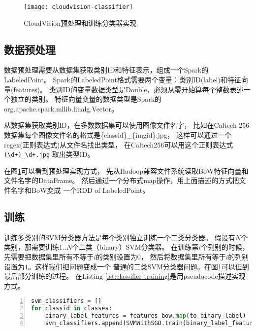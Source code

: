 \begin{figure}[h]
  \centering
    \texttt{[image: cloudvision-classifier]}
  \caption{CloudVision预处理和训练分类器实现}
  \label{fig:cloudvision-classifier}
\end{figure}



\subsection{数据预处理}
\label{subsec:classifier-preprocessing}
数据预处理需要从数据集获取类别ID和特征表示，组成一个Spark的LabeledPoint。
Spark的LabeledPoint格式需要两个变量：类别ID(label)和特征向量(features)。
类别ID的变量数据类型是Double，必须从零开始算每个整数表述一个独立的类别。
特征向量变量的数据类型是Spark的org.apache.spark.mllib.linalg.Vector。

从数据集获取类别ID，在多数数据集可以使用图像文件名字，
比如在Caltech-256数据集每个图像文件名的格式是\{classid\}\_\{imgid\}.jpg，
这样可以通过一个regex(正则表达式)从文件名找出类型，
在Caltech256可以用这个正则表达式\verb|(\d+)_\d+.jpg|
取出类型ID。

在图\ref{fig:cloudvision-classifier}可以看到预处理实现方式，
先从Hadoop兼容文件系统读取BoW特征向量和文件名字的DataFrame。
然后通过一个分布式map操作，用上面描述的方式把文件名字和BoW变成
一个RDD of LabeledPoint。



\subsection{训练}
\label{subsec:classifier-training}
训练多类别的SVM分类器方法是每个类别独立训练一个二类分类器。
假设有$N$个类别，那需要训练$1..N$个二类（binary）SVM分类器。
在训练第$i$个列别的时候，先需要把数据集里所有不等于$i$的类别设置为$0$，
然后将数据集里所有等于$i$的列别设置为$1$。这样我们把问题变成一个
普通的二类SVM分类器问题。在图\ref{fig:cloudvision-classifier}可以但到最后部分训练的过程。
在Listing \ref{lst:classifier-training}是用pseudocode描述实现方式。
\begin{lstlisting}[language=Python,
                   basicstyle=\small,
                   numbers=left,
                   showstringspaces=false,
                   caption={SVM多类别分类器训练pseudocode},
                   label={lst:classifier-training}]
svm_classifiers = []
for classid in classes:
    binary_label_features = features_bow.map(to_binary_label)
    svm_classifiers.append(SVMWithSGD.train(binary_label_features))
\end{lstlisting}



